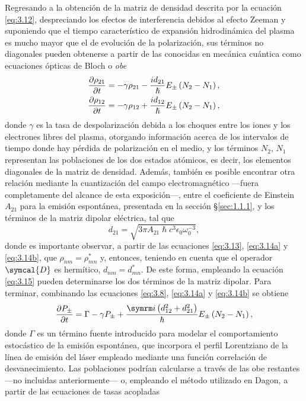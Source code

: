 Regresando a la obtención de la matriz de densidad descrita por la ecuación \eqref{eq:3.12}, despreciando los efectos de interferencia debidos al efecto Zeeman \autocite{Sureau1995} y suponiendo que el tiempo característico de expansión hidrodinámica del plasma es mucho mayor que el de evolución de la polarización, sus términos no diagonales pueden obtenerse a partir de las conocidas en mecánica cuántica \autocite{milonniLasers1988} como ecuaciones ópticas de Bloch o \emph{\acrfull{obe}}
\begin{align}
  \label{eq:3.14a}
  \frac{\partial\rho_{21}}{\partial t} &= -\gamma \rho_{21} - \frac{id_{21}}{\hslash }E_{\pm }\left(N_{2}-N_{1}\right), \\
  \label{eq:3.14b}
  \frac{\partial\rho_{12}}{\partial t} &= -\gamma \rho_{12} + \frac{id_{12}}{\hslash }E_{\pm }\left(N_{2}-N_{1}\right),
\end{align}
donde $\gamma$ es la tasa de despolarización debida a los choques entre los iones y los electrones libres del plasma, otorgando información acerca de los intervalos de tiempo donde hay pérdida de polarización en el medio, y los términos $N_{2}$, $N_{1}$ representan las poblaciones de los dos estados atómicos, es decir, los elementos diagonales de la matriz de densidad. Además, también es posible encontrar otra relación mediante la cuantización del campo electromagnético \autocite{cohen-tannoudjiQuantumMechanicsVolume2019b} ---fuera completamente del alcance de esta exposición---, entre el coeficiente de Einstein $A_{21}$ para la emisión espontánea, presentada en la sección \S\ref{sec:1.1.1}, y los términos de la matriz dipolar eléctrica, tal que 
\begin{equation}\label{eq:3.15}
  d_{21} = \sqrt{3 \pi A_{21} \hslash c^{3} \epsilon_{0}\omega^{-3}_{0}}, 
\end{equation}
donde es importante observar, a partir de las ecuaciones \eqref{eq:3.13}, \eqref{eq:3.14a} y \eqref{eq:3.14b}, que $\rho_{nm} = \rho^{*}_{mn}$ y, entonces, teniendo en cuenta que el operador $\symcal{D}$ es hermítico, $d_{nm} = d^{*}_{mn}$. De este forma, empleando la ecuación \eqref{eq:3.15} pueden determinarse los dos términos de la matriz dipolar.
Para terminar, combinando las ecuaciones \eqref{eq:3.8}, \eqref{eq:3.14a} y \eqref{eq:3.14b} se obtiene 
\begin{equation}\label{eq:3.16}
  \pdv{P_{\pm }}{t} = \Gamma - \gamma P_{\pm } + \frac{\iu \left(d^{2}_{12} + d^{2}_{21}\right)}{\hslash }E_{\pm }\left(N_{2}-N_{1}\right),
\end{equation}
donde $\Gamma$ es un término fuente introducido \autocite{Oliva2012} para modelar el comportamiento estocástico de la emisión espontánea, que incorpora el perfil Lorentziano de la línea de emisión del láser empleado mediante una función correlación de desvanecimiento. Las poblaciones podrían calcularse a través de las \acrshort{obe} restantes ---no incluidas anteriormente--- o, empleando el método utilizado en Dagon, a partir de las ecuaciones de tasas acopladas 
